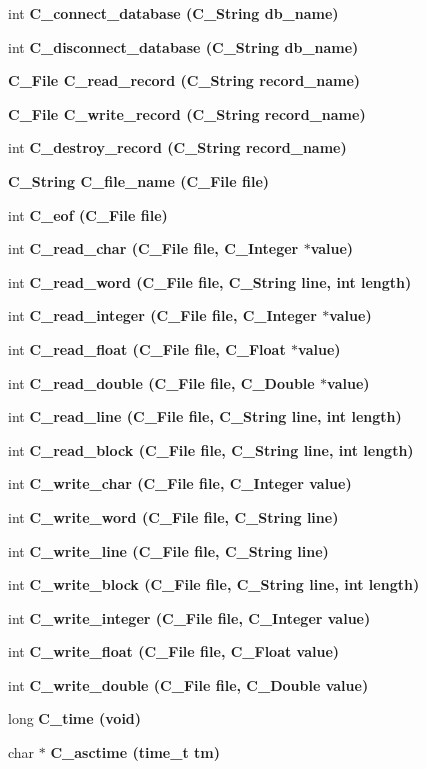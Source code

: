 \begin{CompactItemize}
\item 
int \bf{C\_\-connect\_\-database} (\bf{C\_\-String} db\_\-name)
\item 
int \bf{C\_\-disconnect\_\-database} (\bf{C\_\-String} db\_\-name)
\item 
\bf{C\_\-File} \bf{C\_\-read\_\-record} (\bf{C\_\-String} record\_\-name)
\item 
\bf{C\_\-File} \bf{C\_\-write\_\-record} (\bf{C\_\-String} record\_\-name)
\item 
int \bf{C\_\-destroy\_\-record} (\bf{C\_\-String} record\_\-name)
\item 
\bf{C\_\-String} \bf{C\_\-file\_\-name} (\bf{C\_\-File} \bf{file})
\item 
int \bf{C\_\-eof} (\bf{C\_\-File} \bf{file})
\item 
int \bf{C\_\-read\_\-char} (\bf{C\_\-File} \bf{file}, \bf{C\_\-Integer} $\ast$value)
\item 
int \bf{C\_\-read\_\-word} (\bf{C\_\-File} \bf{file}, \bf{C\_\-String} line, int length)
\item 
int \bf{C\_\-read\_\-integer} (\bf{C\_\-File} \bf{file}, \bf{C\_\-Integer} $\ast$value)
\item 
int \bf{C\_\-read\_\-float} (\bf{C\_\-File} \bf{file}, \bf{C\_\-Float} $\ast$value)
\item 
int \bf{C\_\-read\_\-double} (\bf{C\_\-File} \bf{file}, \bf{C\_\-Double} $\ast$value)
\item 
int \bf{C\_\-read\_\-line} (\bf{C\_\-File} \bf{file}, \bf{C\_\-String} line, int length)
\item 
int \bf{C\_\-read\_\-block} (\bf{C\_\-File} \bf{file}, \bf{C\_\-String} line, int length)
\item 
int \bf{C\_\-write\_\-char} (\bf{C\_\-File} \bf{file}, \bf{C\_\-Integer} value)
\item 
int \bf{C\_\-write\_\-word} (\bf{C\_\-File} \bf{file}, \bf{C\_\-String} line)
\item 
int \bf{C\_\-write\_\-line} (\bf{C\_\-File} \bf{file}, \bf{C\_\-String} line)
\item 
int \bf{C\_\-write\_\-block} (\bf{C\_\-File} \bf{file}, \bf{C\_\-String} line, int length)
\item 
int \bf{C\_\-write\_\-integer} (\bf{C\_\-File} \bf{file}, \bf{C\_\-Integer} value)
\item 
int \bf{C\_\-write\_\-float} (\bf{C\_\-File} \bf{file}, \bf{C\_\-Float} value)
\item 
int \bf{C\_\-write\_\-double} (\bf{C\_\-File} \bf{file}, \bf{C\_\-Double} value)
\item 
long \bf{C\_\-time} (void)
\item 
char $\ast$ \bf{C\_\-asctime} (time\_\-t tm)
\end{CompactItemize}


